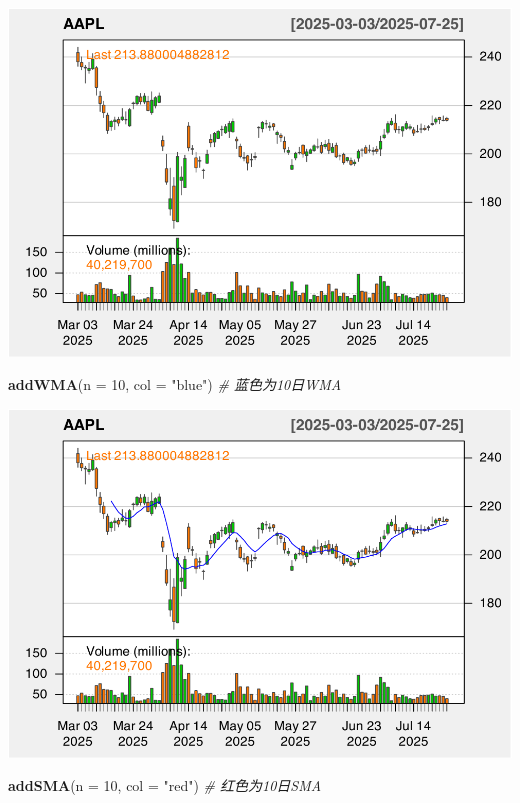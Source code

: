 \documentclass[]{ctexbook}
\newenvironment{Shaded}{\begin{snugshade}}{\end{snugshade}}
\newcommand{\AttributeTok}[1]{\textcolor[rgb]{0.13,0.29,0.53}{#1}}
\newcommand{\CommentTok}[1]{\textcolor[rgb]{0.56,0.35,0.01}{\textit{#1}}}
\newcommand{\DecValTok}[1]{\textcolor[rgb]{0.00,0.00,0.81}{#1}}
\newcommand{\FunctionTok}[1]{\textcolor[rgb]{0.13,0.29,0.53}{\textbf{#1}}}
\newcommand{\NormalTok}[1]{#1}
\newcommand{\StringTok}[1]{\textcolor[rgb]{0.31,0.60,0.02}{#1}}
\begin{document}
\includegraphics[width=0.9\linewidth]{QuantmodHandbook_files/figure-latex/wma-1}

\begin{Shaded}
\begin{Highlighting}[]
\FunctionTok{addWMA}\NormalTok{(}\AttributeTok{n =} \DecValTok{10}\NormalTok{, }\AttributeTok{col =} \StringTok{"blue"}\NormalTok{)    }\CommentTok{\# 蓝色为10日WMA}
\end{Highlighting}
\end{Shaded}

\includegraphics[width=0.9\linewidth]{QuantmodHandbook_files/figure-latex/wma-2}

\begin{Shaded}
\begin{Highlighting}[]
\FunctionTok{addSMA}\NormalTok{(}\AttributeTok{n =} \DecValTok{10}\NormalTok{, }\AttributeTok{col =} \StringTok{"red"}\NormalTok{)     }\CommentTok{\# 红色为10日SMA}
\end{Highlighting}
\end{Shaded}
\end{document}
